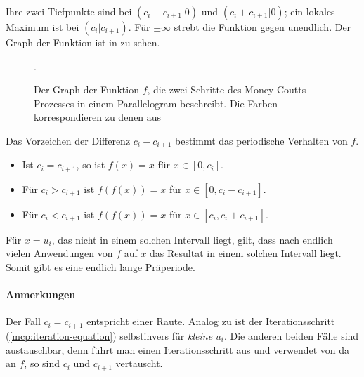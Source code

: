 Ihre zwei Tiefpunkte sind bei $(c_i-c_{i+1}|0)$ und $(c_i+c_{i+1}|0)$;
ein lokales Maximum ist bei $(c_i|c_{i+1})$.
Für $\pm\infty$ strebt die Funktion gegen unendlich.
Der Graph der Funktion ist in  zu sehen.

\begin{figure}
    
    \caption{Der Graph der Funktion $f$, die zwei Schritte des Money-Coutts-Prozesses in einem Parallelogram beschreibt.
        Die Farben korrespondieren zu denen aus }.
    \label{parallogram:function-graph}
\end{figure}

Das Vorzeichen der Differenz $c_i - c_{i+1}$ bestimmt das periodische Verhalten von $f$.
\begin{itemize}
    \item Ist $c_i=c_{i+1}$, so ist $f(x)=x$ für $x\in[0,c_i]$.
    \item Für $c_i>c_{i+1}$ ist $f(f(x))=x$ für $x\in[0,c_i-c_{i+1}]$.
    \item Für $c_i<c_{i+1}$ ist $f(f(x))=x$ für $x\in[c_i,c_i+c_{i+1}]$.
\end{itemize}

Für $x=u_i$, das nicht in einem solchen Intervall liegt, gilt,
dass nach endlich vielen Anwendungen von $f$ auf $x$ das Resultat in einem solchen Intervall liegt.
Somit gibt es eine endlich lange Präperiode.

\paragraph{Anmerkungen}
Der Fall $c_i=c_{i+1}$ entspricht einer Raute.
Analog zu  ist der Iterationsschritt (\ref{mcp:iteration-equation}) selbstinvers für \emph{kleine} $u_i$.
Die anderen beiden Fälle sind austauschbar, denn führt man einen Iterationsschritt aus und verwendet von da an $f$,
so sind $c_i$ und $c_{i+1}$ vertauscht.

